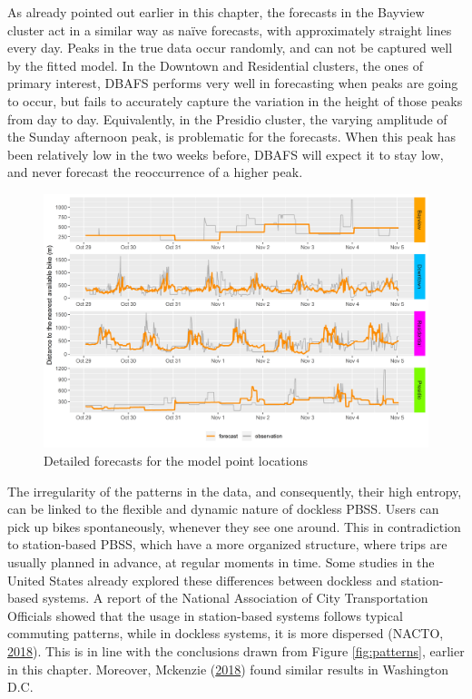 \documentclass[12pt,oneside]{reedthesis}
\begin{document}
As already pointed out earlier in this chapter, the forecasts in the
Bayview cluster act in a similar way as naïve forecasts, with
approximately straight lines every day. Peaks in the true data occur
randomly, and can not be captured well by the fitted model. In the
Downtown and Residential clusters, the ones of primary interest, DBAFS
performs very well in forecasting when peaks are going to occur, but
fails to accurately capture the variation in the height of those peaks
from day to day. Equivalently, in the Presidio cluster, the varying
amplitude of the Sunday afternoon peak, is problematic for the
forecasts. When this peak has been relatively low in the two weeks
before, DBAFS will expect it to stay low, and never forecast the
reoccurrence of a higher peak.
\begin{figure}[H]
\includegraphics[width=\textwidth]{Figures/forecastplot} \caption{Detailed forecasts for the model point locations}\label{fig:forecastplot}
\end{figure}
The irregularity of the patterns in the data, and consequently, their
high entropy, can be linked to the flexible and dynamic nature of
dockless PBSS. Users can pick up bikes spontaneously, whenever they see
one around. This in contradiction to station-based PBSS, which have a
more organized structure, where trips are usually planned in advance, at
regular moments in time. Some studies in the United States already
explored these differences between dockless and station-based systems. A
report of the National Association of City Transportation Officials
showed that the usage in station-based systems follows typical commuting
patterns, while in dockless systems, it is more dispersed (NACTO,
\protect\hyperlink{ref-nacto2018}{2018}). This is in line with the
conclusions drawn from Figure \ref{fig:patterns}, earlier in this
chapter. Moreover, Mckenzie (\protect\hyperlink{ref-mckenzie2018}{2018})
found similar results in Washington D.C.
\end{document}
